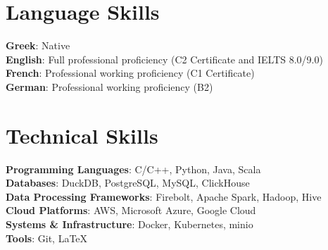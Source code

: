 \documentclass[letterpaper,11pt]{article}
\begin{document}
\section{Language Skills}
 \begin{itemize}[leftmargin=0.15in, label={}]
    \small{\item{
     \textbf{Greek}{: Native } \\
     \textbf{English}{: Full professional proficiency (C2 Certificate and IELTS 8.0/9.0)} \\
     \textbf{French}{: Professional working proficiency (C1 Certificate)} \\
     \textbf{German}{: Professional working proficiency (B2)} \\
    }}
 \end{itemize}
\section{Technical Skills}
\begin{itemize}[leftmargin=0.15in, label={}]
\small{\item{
\textbf{Programming Languages}: C/C++, Python, Java, Scala \\
\textbf{Databases}: DuckDB, PostgreSQL, MySQL, ClickHouse \\
\textbf{Data Processing Frameworks}: Firebolt, Apache Spark, Hadoop, Hive \\
\textbf{Cloud Platforms}: AWS, Microsoft Azure, Google Cloud \\
\textbf{Systems \& Infrastructure}: Docker, Kubernetes, minio \\
\textbf{Tools}: Git, LaTeX
}}
\end{itemize}
\end{document}
